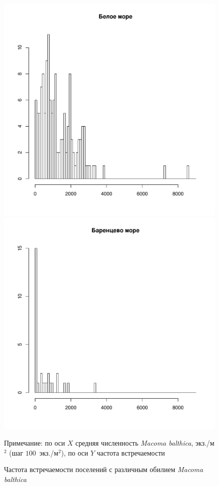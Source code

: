 \documentclass[12pt, a4paper]{disser}
\begin{document}
	\begin{figure}[ht]
		\includegraphics[height=.3\textheight]{../All_N/Nmean_hist_White.pdf}
		\includegraphics[height=.3\textheight]{../All_N/Nmean_hist_Barents.pdf}
	\caption{Частота встречаемости поселений с различным обилием {\it Macoma balthica}}
	{\footnotesize Примечание: по оси $X$ \textemdash средняя численность {\it Macoma balthica}, экз./м$^2$ (шаг \textemdash $100$~экз./м$^2$), по оси $Y$ 	\textemdash частота встречаемости}
	\label{ris:Nmean_hist}
	\end{figure}
\end{document}
